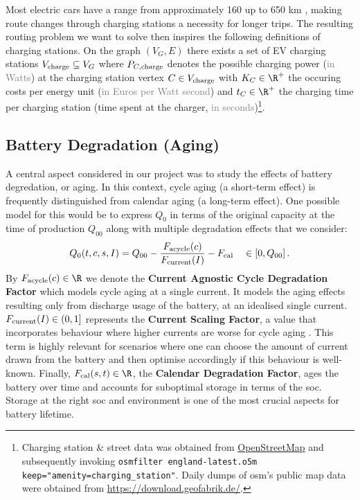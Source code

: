 \documentclass{prettytex/ox/mmsc-special-topic}
\begin{document}
  Most electric cars have a range from approximately 160 up to 650 km \parencite{range}, making route changes through charging stations a necessity for longer trips.
  The resulting routing problem we want to solve then inspires the following definitions of charging stations.
  On the graph $(V_G, E)$ there exists a set of EV charging stations $V_{\rm charge} \subseteq V_G$ where $P_{C,\rm charge}$ denotes the possible charging power (\textcolor{gray}{in Watts}) at the charging station vertex $C \in V_{\rm charge}$ with $K_C \in \R^+$ the occuring costs per energy unit (\textcolor{gray}{in Euros per Watt second}) and $t_C \in \R^+$ the charging time per charging station (time spent at the charger, \textcolor{gray}{in seconds})\footnote{
    Charging station \& street data was obtained from \href{https://osm.org/}{OpenStreetMap} and subsequently invoking
    \texttt{osmfilter england-latest.o5m \-\-keep="amenity=charging\_station"}.
    Daily dumps of \gls{osm}'s public map data were obtained from \url{https://download.geofabrik.de/}.
  }.

  \subsection{Battery Degradation (Aging)}
  A central aspect considered in our project was to study the effects of battery degredation, or aging.
  In this context, cycle aging (a short-term effect) is frequently distinguished from calendar aging (a long-term effect).
  One possible model for this would be to express $Q_0$ in terms of the original capacity at the time of production $Q_{00}$ along with multiple degradation effects that we consider:
  \begin{equation}
    \label{eq:cap}
    Q_0(t,c,s,I) = Q_{00} - \frac{F_{\rm acycle}(c)}{F_{\rm current}(I)} - F_{\rm cal} \quad \in [0, Q_{00}]\,.
  \end{equation}
  By $F_{\rm acycle}(c) \in \R$ we denote the \textbf{Current Agnostic Cycle Degradation Factor} which models cycle aging at a single current. It models the aging effects resulting only from discharge usage of the battery, at an idealised single current.
  $F_{\rm current}(I) \in (0, 1]$ represents the \textbf{Current Scaling Factor}, a value that incorporates behaviour where higher currents are worse for cycle aging \parencite{csfpaper}. This term is highly relevant for scenarios where one can choose the amount of current drawn from the battery and then optimise accordingly if this behaviour is well-known.
  Finally, $F_{\rm cal}(s,t) \in \R$, the \textbf{Calendar Degradation Factor}, ages the battery over time and accounts for suboptimal storage in terms of the \gls{soc}.
  Storage at the right \gls{soc} and environment is one of the most crucial aspects for battery lifetime.
\end{document}
